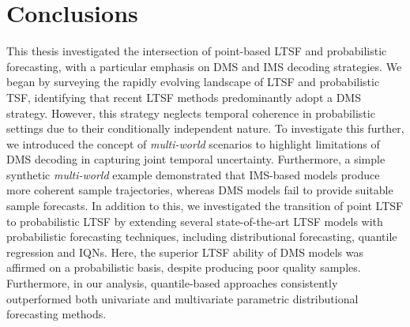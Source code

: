 \documentclass[a4paper,oneside,bibliography=totoc]{scrbook}
\begin{document}

\chapter{Conclusions}
\label{ch:conclusion}
This thesis investigated the intersection of point-based LTSF and probabilistic forecasting, with a particular emphasis on DMS and IMS decoding strategies. 
We began by surveying the rapidly evolving landscape of LTSF and probabilistic TSF, identifying that recent LTSF methods predominantly adopt a DMS strategy.
However, this strategy neglects temporal coherence in probabilistic settings due to their conditionally independent nature.
To investigate this further, we introduced the concept of \textit{multi-world} scenarios to highlight limitations of DMS decoding in capturing joint temporal uncertainty.
Furthermore, a simple synthetic \textit{multi-world} example demonstrated that IMS-based models produce more coherent sample trajectories, whereas DMS models fail to provide suitable sample forecasts.
In addition to this, we investigated the transition of point LTSF to probabilistic LTSF by extending several state-of-the-art LTSF models with probabilistic forecasting techniques, including distributional forecasting, quantile regression and IQNs.  
Here, the superior LTSF ability of DMS models was affirmed on a probabilistic basis, despite producing poor quality samples.
Furthermore, in our analysis, quantile-based approaches consistently outperformed both univariate and multivariate parametric distributional forecasting methods.
\end{document}
